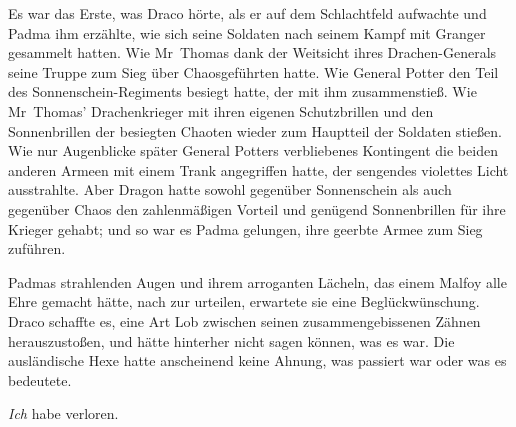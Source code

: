 Es war das Erste, was Draco hörte, als er auf dem Schlachtfeld aufwachte und Padma ihm erzählte, wie sich seine Soldaten nach seinem Kampf mit Granger gesammelt hatten. Wie Mr~Thomas dank der Weitsicht ihres Drachen-Generals seine Truppe zum Sieg über Chaosgeführten hatte.
Wie General Potter den Teil des Sonnenschein-Regiments besiegt hatte, der mit ihm zusammenstieß. Wie Mr~Thomas’ Drachenkrieger mit ihren eigenen Schutzbrillen und den Sonnenbrillen der besiegten Chaoten wieder zum Hauptteil der Soldaten stießen. Wie nur Augenblicke später General Potters verbliebenes Kontingent die beiden anderen Armeen mit einem Trank angegriffen hatte, der sengendes violettes Licht ausstrahlte. Aber Dragon hatte sowohl gegenüber Sonnenschein als auch gegenüber Chaos den zahlenmäßigen Vorteil und genügend Sonnenbrillen für ihre Krieger gehabt; und so war es Padma gelungen, ihre geerbte Armee zum Sieg zuführen.

Padmas strahlenden Augen und ihrem arroganten Lächeln, das einem Malfoy alle Ehre gemacht hätte, nach zur urteilen, erwartete sie eine Beglückwünschung. Draco schaffte es, eine Art Lob zwischen seinen zusammengebissenen Zähnen herauszustoßen, und hätte hinterher nicht sagen können, was es war. Die ausländische Hexe hatte anscheinend keine Ahnung, was passiert war oder was es bedeutete.

\emph{Ich} habe verloren.

